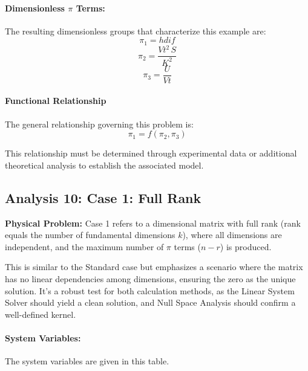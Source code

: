         \paragraph{Dimensionless $\pi$ Terms: }
        The resulting dimensionless groups that characterize this example are:
\begin{equation}
\pi_{1} = hdif
\end{equation}
\begin{equation}
\pi_{2} = \frac{Vt^{2} \, S}{K^{2}}
\end{equation}
\begin{equation}
\pi_{3} = \frac{U}{Vt}
\end{equation}

                    \paragraph{Functional Relationship}
                    The general relationship governing this problem is:
                    \begin{equation}
                    \pi_1 = f(\pi_2,\pi_3)
                    \end{equation}

                    This relationship must be determined through experimental data or additional theoretical analysis to establish the associated model.


\subsection{Analysis 10: Case 1: Full Rank}
\label{sec:Case_1_Full_Rank}

\begin{problembox}
\textbf{Physical Problem:} Case 1 refers to a dimensional matrix with full rank (rank equals the number of fundamental dimensions $k$), where all dimensions are independent, and the maximum number of $\pi$ terms ($n - r$) is produced.
\end{problembox}

This is similar to the Standard case but emphasizes a scenario where the matrix has no linear dependencies among dimensions, ensuring the zero as the unique solution. It's a robust test for both calculation methods, as the Linear System Solver should yield a clean solution, and Null Space Analysis should confirm a well-defined kernel.

\paragraph{System Variables: } The system variables are given in this table.

